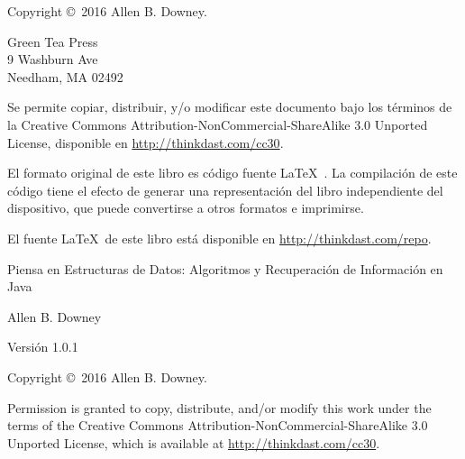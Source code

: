 \documentclass[12pt]{book}
\newcommand{\thetitle}{Piensa en Estructuras de Datos}
\newcommand{\thesubtitle}{Algoritmos y Recuperación de Información en Java}
\newcommand{\theauthors}{Allen B. Downey}
\newcommand{\theversion}{1.0.1}
\theoremstyle{exercise}
\begin{document}
\begin{latexonly}
\begin{flushright}
\vfill
\end{flushright}

\newpage
\thispagestyle{empty}

Copyright \copyright ~2016 \theauthors.

\vspace{0.2in}

\begin{flushleft}
Green Tea Press \\
9 Washburn Ave \\
Needham, MA 02492
\end{flushleft}

Se permite copiar, distribuir, y/o modificar este documento
bajo los términos de la Creative Commons
Attribution-NonCommercial-ShareAlike 3.0 Unported License,
disponible en \url{http://thinkdast.com/cc30}.

El formato original de este libro es código fuente \LaTeX\ . La compilación de este
código tiene el efecto de generar una representación del libro independiente del
dispositivo, que puede convertirse a otros formatos e imprimirse.

El fuente \LaTeX\ de este libro está disponible en
\url{http://thinkdast.com/repo}.


\cleardoublepage
\setcounter{tocdepth}{1}
\tableofcontents

\end{latexonly}


\begin{htmlonly}

\vspace{1em}

{\Large \thetitle: \thesubtitle}

{\large \theauthors}

Versión \theversion

\vspace{1em}

Copyright \copyright ~2016 \theauthors.

Permission is granted to copy, distribute, and/or modify this work
under the terms of the Creative Commons
Attribution-NonCommercial-ShareAlike 3.0 Unported License, which is
available at \url{http://thinkdast.com/cc30}.

\vspace{1em}

\end{htmlonly}
\end{document}
